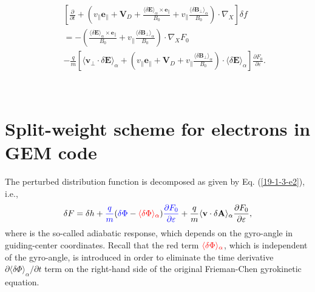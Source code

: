 \documentclass{llncs}
\newcommand{\tmcolor}[2]{{\color{#1}{#2}}}
\begin{document}
\begin{eqnarray}
  &  & \left[ \frac{\partial}{\partial t} + \left( v_{\parallel}
  \mathbf{e}_{\parallel} +\mathbf{V}_D + \frac{ \langle \delta \mathbf{E}
  \rangle_{\alpha} \times \mathbf{e}_{\parallel}}{B_0} + v_{\parallel}
  \frac{\langle \delta \mathbf{B}_{\perp} \rangle_{\alpha}}{B_0} \right) \cdot
  \nabla_X \right] \delta f \nonumber\\
  &  & = - \left( \frac{ \langle \delta \mathbf{E} \rangle_{\alpha} \times
  \mathbf{e}_{\parallel}}{B_0} + v_{\parallel} \frac{\langle \delta
  \mathbf{B}_{\perp} \rangle_{\alpha}}{B_0} \right) \cdot \nabla_X F_0
  \nonumber\\
  &  & - \frac{q}{m} \left[ \langle \mathbf{v}_{\perp} \cdot \delta
  \mathbf{E} \rangle_{\alpha} + \left( v_{\parallel} \mathbf{e}_{\parallel}
  +\mathbf{V}_D + v_{\parallel} \frac{\langle \delta \mathbf{B}_{\perp}
  \rangle_{\alpha}}{B_0} \right) \cdot \langle \delta \mathbf{E}
  \rangle_{\alpha} \right] \frac{\partial F_0}{\partial \varepsilon} . 
  \label{18-8-26-2}
\end{eqnarray}


\

\section{Split-weight scheme for electrons in GEM code}

The perturbed distribution function is decomposed as given by Eq.
(\ref{19-1-3-e2}), i.e.,
\begin{equation}
  \label{22-11-13-e2} \delta F = \delta h + \tmcolor{blue}{\frac{q}{m}}
  (\tmcolor{blue}{\delta \Phi} - \tmcolor{red}{\langle \delta \Phi
  \rangle_{\alpha}}) \tmcolor{blue}{\frac{\partial F_0}{\partial \varepsilon}}
  + \frac{q}{m} \langle \mathbf{v} \cdot \delta \mathbf{A} \rangle_{\alpha}
  \frac{\partial F_0}{\partial \varepsilon},
\end{equation}
where \tmcolor{blue}{the term in blue} is the so-called adiabatic response,
which depends on the gyro-angle in guiding-center coordinates. Recall that the
red term $\tmcolor{red}{\langle \delta \Phi \rangle_{\alpha}}$, which is
independent of the gyro-angle, is introduced in order to eliminate the time
derivative $\partial \langle \delta \Phi \rangle_{\alpha} / \partial t$ term
on the right-hand side of the original Frieman-Chen gyrokinetic equation.
\end{document}

